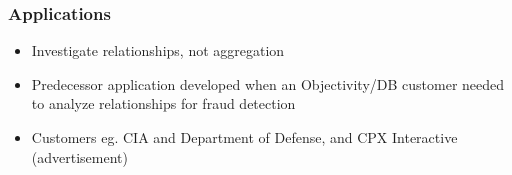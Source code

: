 
\begin{frame}
\frametitle{Applications}
\begin{itemize}
    \item Investigate relationships, not aggregation
    \item Predecessor application developed when an Objectivity/DB customer needed to analyze relationships for fraud detection
    \item Customers eg. CIA and Department of Defense, and CPX Interactive (advertisement)
\end{itemize}
\end{frame}
